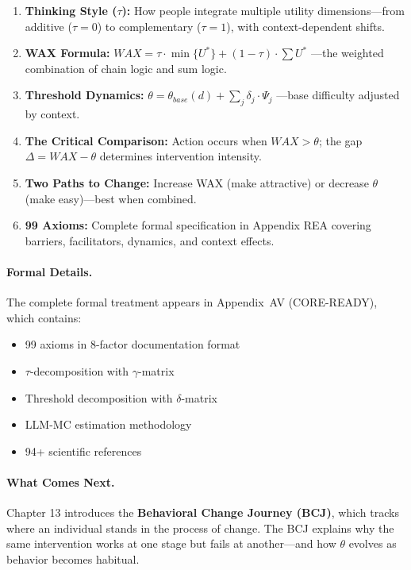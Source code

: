 \begin{enumerate}
    \item \textbf{Thinking Style ($\tau$):} How people integrate multiple utility
          dimensions---from additive ($\tau = 0$) to complementary ($\tau = 1$),
          with context-dependent shifts.

    \item \textbf{WAX Formula:} $WAX = \tau \cdot \min\{U^*\} + (1-\tau) \cdot \sum U^*$
          ---the weighted combination of chain logic and sum logic.

    \item \textbf{Threshold Dynamics:} $\theta = \theta_{base}(d) + \sum_j \delta_j \cdot \Psi_j$
          ---base difficulty adjusted by context.

    \item \textbf{The Critical Comparison:} Action occurs when $WAX > \theta$;
          the gap $\Delta = WAX - \theta$ determines intervention intensity.

    \item \textbf{Two Paths to Change:} Increase WAX (make attractive) or
          decrease $\theta$ (make easy)---best when combined.

    \item \textbf{99 Axioms:} Complete formal specification in Appendix REA
          covering barriers, facilitators, dynamics, and context effects.
\end{enumerate}

\paragraph{Formal Details.}
The complete formal treatment appears in Appendix~AV (CORE-READY), which contains:
\begin{itemize}[nosep]
    \item 99 axioms in 8-factor documentation format
    \item $\tau$-decomposition with $\gamma$-matrix
    \item Threshold decomposition with $\delta$-matrix
    \item LLM-MC estimation methodology
    \item 94+ scientific references
\end{itemize}

\paragraph{What Comes Next.}
Chapter 13 introduces the \textbf{Behavioral Change Journey (BCJ)}, which tracks
where an individual stands in the process of change. The BCJ explains why the
same intervention works at one stage but fails at another---and how $\theta$
evolves as behavior becomes habitual.

